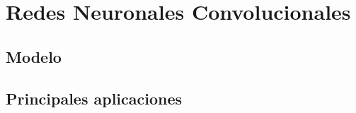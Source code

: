 \chapter{Redes Neuronales Convolucionales}\label{ch:CNN}

\section{Modelo}

\section{Principales aplicaciones}